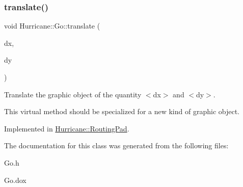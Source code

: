 \subsubsection{\texorpdfstring{translate()}{translate()}}
{\footnotesize\ttfamily void Hurricane\+::\+Go\+::translate (\begin{DoxyParamCaption}\item[{const \mbox{\hyperlink{group__DbUGroup_ga4fbfa3e8c89347af76c9628ea06c4146}{Db\+U\+::\+Unit}} \&}]{dx,  }\item[{const \mbox{\hyperlink{group__DbUGroup_ga4fbfa3e8c89347af76c9628ea06c4146}{Db\+U\+::\+Unit}} \&}]{dy }\end{DoxyParamCaption})\hspace{0.3cm}{\ttfamily [pure virtual]}}

Translate the graphic object of the quantity {\ttfamily $<$dx$>$} and {\ttfamily $<$dy$>$}.

This virtual method should be specialized for a new kind of graphic object. 

Implemented in \mbox{\hyperlink{classHurricane_1_1RoutingPad_a41bf66ffda0c0ceaaebc67acd72d5b36}{Hurricane\+::\+Routing\+Pad}}.



The documentation for this class was generated from the following files\+:\begin{DoxyCompactItemize}
\item 
Go.\+h\item 
Go.\+dox\end{DoxyCompactItemize}
